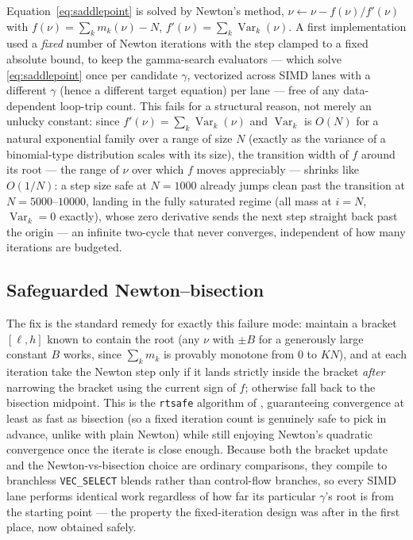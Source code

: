 \documentclass[11pt]{article}
\newcommand{\Var}{\operatorname{Var}}
\begin{document}
Equation~\eqref{eq:saddlepoint} is solved by Newton's method,
$\nu \leftarrow \nu - f(\nu)/f'(\nu)$ with $f(\nu)=\sum_k m_k(\nu)-N$,
$f'(\nu)=\sum_k \Var_k(\nu)$. A first implementation used a \emph{fixed} number of
Newton iterations with the step clamped to a fixed absolute bound, to keep the
gamma-search evaluators --- which solve \eqref{eq:saddlepoint} once per candidate
$\gamma$, vectorized across SIMD lanes with a different $\gamma$ (hence a different
target equation) per lane --- free of any data-dependent loop-trip count. This fails for
a structural reason, not merely an unlucky constant: since $f'(\nu) = \sum_k\Var_k(\nu)$
and $\Var_k$ is $O(N)$ for a natural exponential family over a range of size $N$
(exactly as the variance of a binomial-type distribution scales with its size), the
transition width of $f$ around its root --- the range of $\nu$ over which $f$ moves
appreciably --- shrinks like $O(1/N)$: a step size safe at $N=1000$ already jumps clean
past the transition at $N=5000$--$10000$, landing in the fully saturated regime (all
mass at $i=N$, $\Var_k=0$ exactly), whose zero derivative sends the next step straight
back past the origin --- an infinite two-cycle that never converges, independent of how
many iterations are budgeted.

\subsection{Safeguarded Newton--bisection}

The fix is the standard remedy for exactly this failure mode: maintain a bracket
$[\ell,h]$ known to contain the root (any $\nu$ with $\pm B$ for a generously large
constant $B$ works, since $\sum_k m_k$ is provably monotone from $0$ to $KN$), and at
each iteration take the Newton step only if it lands strictly inside the bracket
\emph{after} narrowing the bracket using the current sign of $f$; otherwise fall back to
the bisection midpoint. This is the \texttt{rtsafe} algorithm of
\citet{numericalrecipes1992}, guaranteeing convergence at least as fast as bisection
(so a fixed iteration count is genuinely safe to pick in advance, unlike with plain
Newton) while still enjoying Newton's quadratic convergence once the iterate is close
enough. Because both the bracket update and the Newton-vs-bisection choice are ordinary
comparisons, they compile to branchless \texttt{VEC\_SELECT} blends rather than
control-flow branches, so every SIMD lane performs identical work regardless of how far
its particular $\gamma$'s root is from the starting point --- the property the
fixed-iteration design was after in the first place, now obtained safely.
\end{document}
